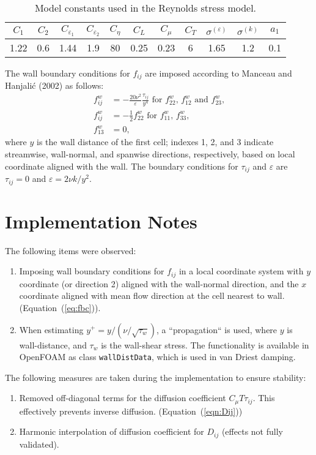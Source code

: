 \documentclass[11pt]{article}
\begin{document}
\begin{table}[h!]
  \begin{center}
  \caption{\label{table1}Model constants used in the Reynolds stress
    model.} 
  \begin{tabular}{ccccccccccc}
    \hline
    $C_1$ & $C_2$ & $C_{\varepsilon_1}$ &
    $C_{\varepsilon_2}$ & $C_{\eta}$ & $C_{L}$ &
    $C_{\mu}$ & $C_{T}$ & $\sigma^{(\varepsilon)}$ &
    $\sigma^{(k)}$ & $a_1$ \\ 
    \hline
    1.22 & 0.6 & 1.44 & 1.9 & 80 & 0.25 & 0.23 & 6 & 1.65 & 1.2 & 0.1 \\ \hline
  \end{tabular}
\end{center}
\end{table}


The wall boundary conditions for $f_{ij}$ are imposed according to
Manceau and Hanjali\'c (2002) as follows:
\begin{align}
 f_{ij}^{w}&=-\frac{20\nu^2}{\varepsilon}\frac{\tau_{ij}}{y^4}
   \text{ for $f_{22}^{w}$, $f_{12}^{w}$ and 
   $f_{23}^{w}$,} \nonumber \\ 
 f_{ij}^{w}&=-\frac{1}{2}f_{22}^{w} \text{ for $f_{11}^{w}$,
   $f_{33}^{w}$,} \label{eq:fbc} \\
   f_{13}^{w}&=0, \nonumber
\end{align}
where $y$ is the wall distance of the first cell; indexes 1, 2, and 3
indicate streamwise, wall-normal, and spanwise directions,
respectively, based on local coordinate aligned with the wall.  The
boundary conditions for $\tau_{ij}$ and $\varepsilon$ are $\tau_{ij}
= 0$ and $\varepsilon=2\nu k/y^2$.

\section{Implementation Notes}

The following items were observed:
\begin{enumerate}
\item Imposing wall boundary conditions for $f_{ij}$ in a local coordinate
system with $y$ coordinate (or direction 2) aligned with the
wall-normal direction, and the $x$ coordinate aligned with mean flow
direction at the cell nearest to wall. (Equation~(\ref{eq:fbc})).
\item When estimating $y^+ = y/(\nu/\sqrt{\tau_w})$,  a
  ``propagation`` is used, where $y$ is wall-distance, and $\tau_w$ is
  the wall-shear stress.  The functionality is available in OpenFOAM
  as class \verb+wallDistData+, which is used in van Driest damping.
\end{enumerate}

The following measures are taken during the implementation to ensure
stability:
\begin{enumerate}
\item Removed off-diagonal terms for the diffusion coefficient
  $C_{\mu} T \tau_{ij}$. This effectively prevents inverse
  diffusion. (Equation~(\ref{eqn:Dij}))
\item Harmonic interpolation of diffusion coefficient for $D_{ij}$
  (effects not fully validated).
\end{enumerate}
\end{document}
